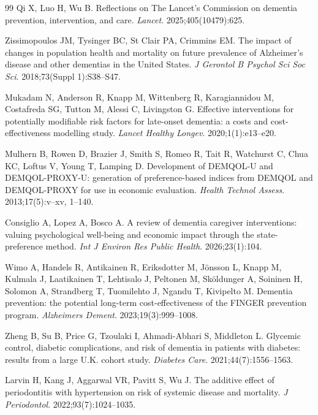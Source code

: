 \documentclass[11pt,a4paper]{article}
\begin{document}
\begin{thebibliography}{99}
 Qi X, Luo H, Wu B. Reflections on The Lancet's Commission on dementia prevention, intervention, and care. \textit{Lancet}. 2025;405(10479):625.

 Zissimopoulos JM, Tysinger BC, St Clair PA, Crimmins EM. The impact of changes in population health and mortality on future prevalence of Alzheimer's disease and other dementias in the United States. \textit{J Gerontol B Psychol Sci Soc Sci}. 2018;73(Suppl 1):S38--S47.

 Mukadam N, Anderson R, Knapp M, Wittenberg R, Karagiannidou M, Costafreda SG, Tutton M, Alessi C, Livingston G. Effective interventions for potentially modifiable risk factors for late-onset dementia: a costs and cost-effectiveness modelling study. \textit{Lancet Healthy Longev}. 2020;1(1):e13--e20.

 Mulhern B, Rowen D, Brazier J, Smith S, Romeo R, Tait R, Watchurst C, Chua KC, Loftus V, Young T, Lamping D. Development of DEMQOL-U and DEMQOL-PROXY-U: generation of preference-based indices from DEMQOL and DEMQOL-PROXY for use in economic evaluation. \textit{Health Technol Assess}. 2013;17(5):v--xv, 1--140.

 Consiglio A, Lopez A, Bosco A. A review of dementia caregiver interventions: valuing psychological well-being and economic impact through the state-preference method. \textit{Int J Environ Res Public Health}. 2026;23(1):104.

 Wimo A, Handels R, Antikainen R, Eriksdotter M, Jönsson L, Knapp M, Kulmala J, Laatikainen T, Lehtisalo J, Peltonen M, Sköldunger A, Soininen H, Solomon A, Strandberg T, Tuomilehto J, Ngandu T, Kivipelto M. Dementia prevention: the potential long-term cost-effectiveness of the FINGER prevention program. \textit{Alzheimers Dement}. 2023;19(3):999--1008.

 Zheng B, Su B, Price G, Tzoulaki I, Ahmadi-Abhari S, Middleton L. Glycemic control, diabetic complications, and risk of dementia in patients with diabetes: results from a large U.K. cohort study. \textit{Diabetes Care}. 2021;44(7):1556--1563.

 Larvin H, Kang J, Aggarwal VR, Pavitt S, Wu J. The additive effect of periodontitis with hypertension on risk of systemic disease and mortality. \textit{J Periodontol}. 2022;93(7):1024--1035.

\end{thebibliography}
\end{document}
